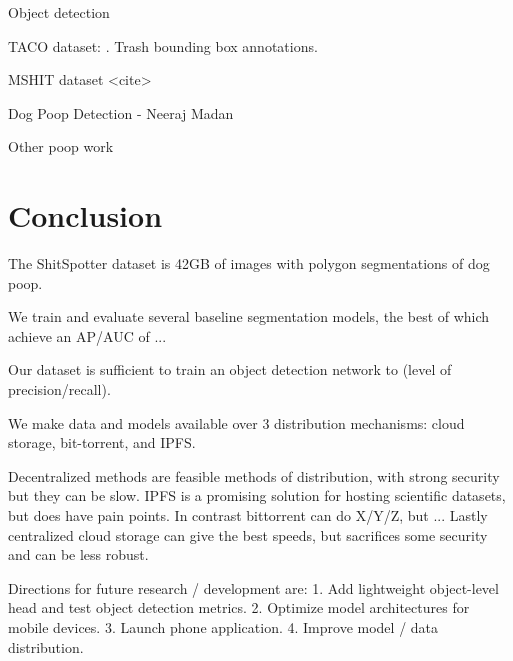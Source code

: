 \documentclass[10pt,twocolumn,letterpaper]{article}
\begin{document}
Object detection

TACO dataset: \cite{proenca_taco_2020}. Trash bounding box annotations.

MSHIT dataset <cite>

Dog Poop Detection - Neeraj Madan

Other poop work

\section{Conclusion}

The ShitSpotter dataset is 42GB of images with polygon segmentations of dog
poop. 

We train and evaluate several baseline segmentation models, the best of which 
achieve an AP/AUC of ...

Our dataset is sufficient to train an object detection network to (level of
precision/recall).

We make data and models available over 3 distribution mechanisms: 
cloud storage, bit-torrent, and IPFS.

Decentralized methods are feasible methods of distribution, with strong
security but they can be slow.
IPFS is a promising solution for hosting scientific datasets, but does have pain points.
In contrast bittorrent can do X/Y/Z, but ...
Lastly centralized cloud storage can give the best speeds, but sacrifices some
security and can be less robust.

Directions for future research / development are:
1. Add lightweight object-level head and test object detection metrics.
2. Optimize model architectures for mobile devices.
3. Launch phone application.
4. Improve model / data distribution.


{\small


}
\end{document}
